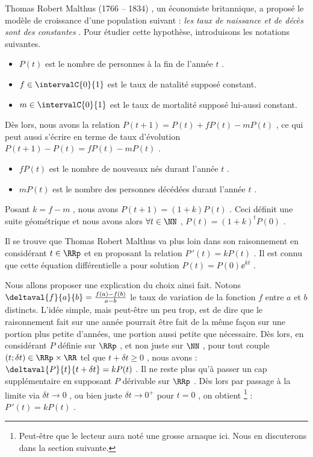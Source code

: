 Thomas Robert Malthus (1766 -- 1834) , un économiste britannique, a proposé le modèle de croissance d'une population suivant : \emph{\og les taux de naissance et de décès sont des constantes \fg}. Pour étudier cette hypothèse, introduisons les notations suivantes.

\begin{itemize}[label=\small\textbullet]
	\item $P(t)$ est le nombre de personnes à la fin de l'année $t$ .

	\item $f \in \intervalC{0}{1}$ est le taux de natalité supposé constant.

	\item $m \in \intervalC{0}{1}$ est le taux de mortalité supposé lui-aussi constant.
\end{itemize}


Dès lors, nous avons la relation $P(t+1) = P(t) + f P(t) - m P(t)$ , ce qui peut aussi s'écrire en terme de taux d'évolution $P(t+1) - P(t) = f P(t) - m P(t)$ .

\begin{itemize}[label=$\rightarrow$]	
	\item $f P(t)$ est le nombre de nouveaux nés durant l'année $t$ .

	\item $m P(t)$ est le nombre des personnes décédées durant l'année $t$ .
\end{itemize}
	

Posant $k = f - m$ , nous avons $P(t+1)= (1 + k) P(t)$ . Ceci définit une suite géométrique et nous avons alors $\forall t \in \NN$ , $P(t)= (1 + k)^t P(0)$ .


\medskip

Il se trouve que Thomas Robert Malthus va plus loin dans son raisonnement en considérant $t \in \RRp$ et en proposant la relation $P\,'(t) = k P(t)$ . Il est connu que cette équation différentielle a pour solution $P(t) = P(0) \ee^{kt}$ .


\medskip

Nous allons proposer une explication du choix ainsi fait. Notons $\deltaval{f}{a}{b} = \frac{f(a) - f(b)}{a - b}$ le taux de variation de la fonction $f$ entre $a$ et $b$ distincts.
L'idée simple, mais peut-être un peu trop, est de dire que le raisonnement fait sur une année pourrait être fait de la même façon sur une portion plus petite d'années, une portion aussi petite que nécessaire. Dès lors, en considérant $P$ définie sur $\RRp$ , et non juste sur $\NN$ , pour tout couple $(t ; \delta t) \in \RRp \times \RR$ tel que $t + \delta t \geq 0$ , nous avons : $\deltaval{P}{t}{t + \delta t} = k P(t)$ .
Il ne reste plus qu'à passer un cap supplémentaire en supposant $P$ dérivable sur $\RRp$ .
Dès lors par passage à la limite via $\delta t \rightarrow 0$ , ou bien juste $\delta t \rightarrow 0^+$ pour $t = 0$ , on obtient
\footnote{
	Peut-être que le lecteur aura noté une grosse arnaque ici. Nous en discuterons dans la section suivante.
} : $P\,'(t) = k P(t)$ .


